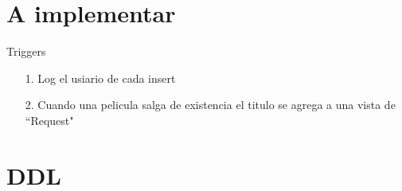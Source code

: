 \documentclass{beamer}%
\begin{document}
\section{A implementar}


\begin{frame}{Triggers}
\begin{itemize}
\item[1.]Log el usiario de cada insert
\item[2.]Cuando una pelicula salga de existencia el titulo se agrega a una vista de ``Request"

\end{itemize}

\end{frame}

\section{DDL}
\begin{frame}

\end{frame}
\end{document}

